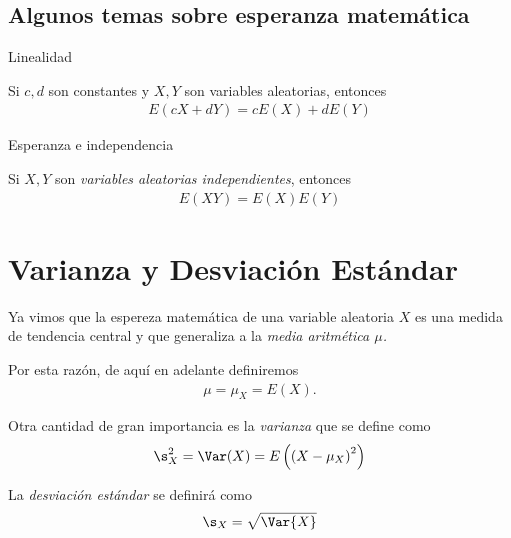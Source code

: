 \subsection{Algunos temas sobre esperanza matemática}
{Linealidad}
 \begin{thm}
  \label{thm:3.1}
  Si $c,d$ son constantes y $X,Y$ son variables aleatorias, entonces
  \begin{align}
   \label{linealidad}
   E\left( cX+dY \right)=
   cE\left( X \right)+dE\left( Y \right)
  \end{align}

 \end{thm}


{Esperanza e independencia}
 \begin{thm}
  \label{thm:3.3} Si $X,Y$ son \emph{variables aleatorias independientes}, entonces
  \begin{align}
   \label{eq:3.10}
   E\left( XY \right)=E(X)E(Y)
  \end{align}

 \end{thm}



\section{Varianza y Desviación Estándar}

 Ya vimos que la espereza matemática de una variable aleatoria $X$ es una medida de tendencia central y que generaliza a la \emph{media aritmética $\mu$.}
 

\begin{rem}
 Por esta razón, de aquí en adelante definiremos
 \begin{align}
  \mu=\mu_{X}=E(X).
 \end{align}

\end{rem}

 


 Otra cantidad de gran importancia es la \emph{varianza} que se define como
 \begin{align}
  \label{eq:3.11}
  \s_{X}^{2}=\Var(X)=E\left( \left( X-\mu_{X} \right)^{2} \right)
 \end{align}



 La \emph{desviación estándar} se definirá como
 \begin{align}
  \label{eq:3.12}
  \s_{X} = \sqrt{\Var{X}}
 \end{align}



